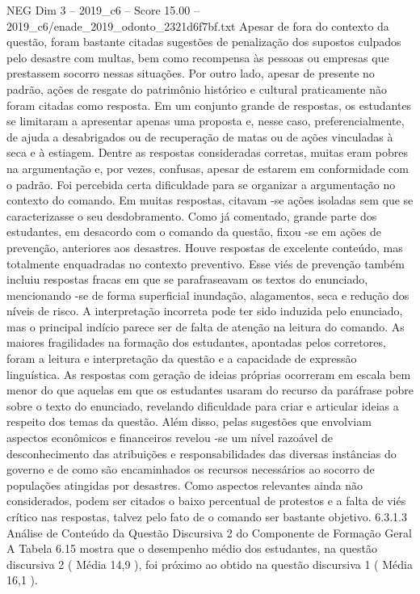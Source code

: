 \begin{textsample}{NEG Dim 3 – 2019\_c6 – Score 15.00 – 2019\_c6/enade\_2019\_odonto\_2321d6f7bf.txt}
Apesar de fora do contexto da questão, foram bastante citadas sugestões de penalização dos supostos culpados pelo desastre com multas, bem como recompensa às pessoas ou empresas que prestassem socorro nessas situações.
Por outro lado, apesar de presente no padrão, ações de resgate do patrimônio histórico e cultural praticamente não foram citadas como resposta.
Em um conjunto grande de respostas, os estudantes se limitaram a apresentar apenas uma proposta e, nesse caso, preferencialmente, de ajuda a desabrigados ou de recuperação de matas ou de ações vinculadas à seca e à estiagem.
Dentre as respostas consideradas corretas, muitas eram pobres na argumentação e, por vezes, confusas, apesar de estarem em conformidade com o padrão.
Foi percebida certa dificuldade para se organizar a argumentação no contexto do comando.
Em muitas respostas, citavam -se ações isoladas sem que se caracterizasse o seu desdobramento.
Como já comentado, grande parte dos estudantes, em desacordo com o comando da questão, fixou -se em ações de prevenção, anteriores aos desastres.
Houve respostas de excelente conteúdo, mas totalmente enquadradas no contexto preventivo.
Esse viés de prevenção também incluiu respostas fracas em que se parafraseavam os textos do enunciado, mencionando -se de forma superficial inundação, alagamentos, seca e redução dos níveis de risco.
A interpretação incorreta pode ter sido induzida pelo enunciado, mas o principal indício parece ser de falta de atenção na leitura do comando.
As maiores fragilidades na formação dos estudantes, apontadas pelos corretores, foram a leitura e interpretação da questão e a capacidade de expressão linguística.
As respostas com geração de ideias próprias ocorreram em escala bem menor do que aquelas em que os estudantes usaram do recurso da paráfrase pobre sobre o texto do enunciado, revelando dificuldade para criar e articular ideias a respeito dos temas da questão.
Além disso, pelas sugestões que envolviam aspectos econômicos e financeiros revelou -se um nível razoável de desconhecimento das atribuições e responsabilidades das diversas instâncias do governo e de como são encaminhados os recursos necessários ao socorro de populações atingidas por desastres.
Como aspectos relevantes ainda não considerados, podem ser citados o baixo percentual de protestos e a falta de viés crítico nas respostas, talvez pelo fato de o comando ser bastante objetivo. 6.3.1.3 Análise de Conteúdo da Questão Discursiva 2 do Componente de Formação Geral A Tabela 6.15 mostra que o desempenho médio dos estudantes, na questão discursiva 2 ( Média 14,9 ), foi próximo ao obtido na questão discursiva 1 ( Média 16,1 ).

\end{textsample}
